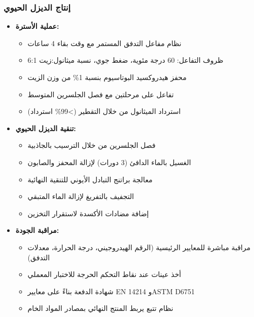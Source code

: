 \subsubsection{إنتاج الديزل الحيوي}
\begin{itemize}
    \item \textbf{عملية الأسترة:}
    \begin{itemize}
        \item نظام مفاعل التدفق المستمر مع وقت بقاء 4 ساعات
        \item ظروف التفاعل: 60 درجة مئوية، ضغط جوي، نسبة ميثانول:زيت 6:1
        \item محفز هيدروكسيد البوتاسيوم بنسبة 1\% من وزن الزيت
        \item تفاعل على مرحلتين مع فصل الجلسرين المتوسط
        \item استرداد الميثانول من خلال التقطير (>99\% استرداد)
    \end{itemize}
    
    \item \textbf{تنقية الديزل الحيوي:}
    \begin{itemize}
        \item فصل الجلسرين من خلال الترسيب بالجاذبية
        \item الغسيل بالماء الدافئ (3 دورات) لإزالة المحفز والصابون
        \item معالجة براتنج التبادل الأيوني للتنقية النهائية
        \item التجفيف بالتفريغ لإزالة الماء المتبقي
        \item إضافة مضادات الأكسدة لاستقرار التخزين
    \end{itemize}
    
    \item \textbf{مراقبة الجودة:}
    \begin{itemize}
        \item مراقبة مباشرة للمعايير الرئيسية (الرقم الهيدروجيني، درجة الحرارة، معدلات التدفق)
        \item أخذ عينات عند نقاط التحكم الحرجة للاختبار المعملي
        \item شهادة الدفعة بناءً على معايير EN 14214 وASTM D6751
        \item نظام تتبع يربط المنتج النهائي بمصادر المواد الخام
    \end{itemize}
\end{itemize}


